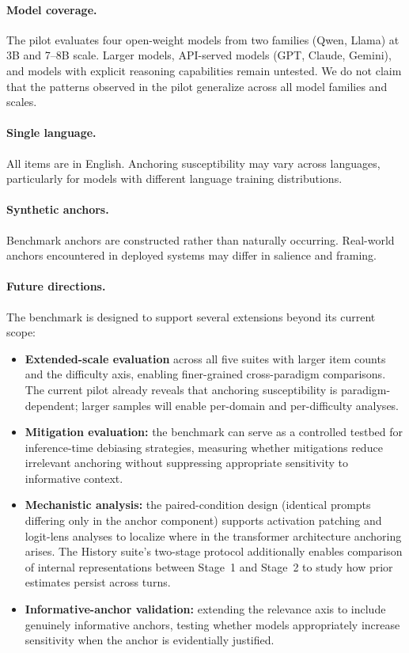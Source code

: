 \paragraph{Model coverage.}
The pilot evaluates four open-weight models from two families
(Qwen, Llama) at 3B and 7--8B scale.
Larger models, API-served models (GPT, Claude, Gemini), and
models with explicit reasoning capabilities remain untested.
We do not claim that the patterns observed in the pilot
generalize across all model families and scales.

\paragraph{Single language.}
All items are in English.
Anchoring susceptibility may vary across languages,
particularly for models with different language training
distributions.

\paragraph{Synthetic anchors.}
Benchmark anchors are constructed rather than naturally
occurring.
Real-world anchors encountered in deployed systems may differ
in salience and framing.

\paragraph{Future directions.}
The benchmark is designed to support several extensions beyond
its current scope:
\begin{itemize}
\item \textbf{Extended-scale evaluation} across all five suites
  with larger item counts and the difficulty axis, enabling
  finer-grained cross-paradigm comparisons.
  The current pilot already reveals that anchoring
  susceptibility is paradigm-dependent; larger samples
  will enable per-domain and per-difficulty analyses.
\item \textbf{Mitigation evaluation:} the benchmark can serve
  as a controlled testbed for inference-time debiasing
  strategies, measuring whether mitigations reduce irrelevant
  anchoring without suppressing appropriate sensitivity to
  informative context.
\item \textbf{Mechanistic analysis:} the paired-condition
  design (identical prompts differing only in the anchor
  component) supports activation patching and logit-lens
  analyses to localize where in the transformer architecture
  anchoring arises.
  The History suite's two-stage protocol additionally enables
  comparison of internal representations between Stage~1 and
  Stage~2 to study how prior estimates persist across turns.
\item \textbf{Informative-anchor validation:} extending the
  relevance axis to include genuinely informative anchors,
  testing whether models appropriately increase sensitivity
  when the anchor is evidentially justified.
\end{itemize}
